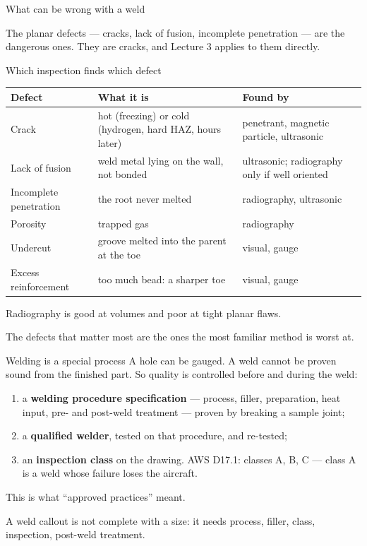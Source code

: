 \documentclass[aspectratio=169,10pt]{beamer}
\begin{document}
\begin{frame}{What can be wrong with a weld}
\centering
\resizebox{0.8\textwidth}{!}{}

\vfill\raggedright
The \alert{planar} defects --- cracks, lack of fusion, incomplete penetration --- are the dangerous
ones. They are cracks, and Lecture 3 applies to them directly.
\end{frame}

\begin{frame}{Which inspection finds which defect}
\centering\footnotesize
\begin{tabular}{@{}lll@{}}
\toprule
\textbf{Defect} & \textbf{What it is} & \textbf{Found by}\\
\midrule
Crack & hot (freezing) or cold (hydrogen, hard HAZ, hours later) & penetrant, magnetic particle, ultrasonic\\
Lack of fusion & weld metal lying on the wall, not bonded & ultrasonic; radiography only if well oriented\\
Incomplete penetration & the root never melted & radiography, ultrasonic\\
Porosity & trapped gas & radiography\\
Undercut & groove melted into the parent at the toe & visual, gauge\\
Excess reinforcement & too much bead: a sharper toe & visual, gauge\\
\bottomrule
\end{tabular}

\vfill\raggedright\normalsize
Radiography is good at volumes and poor at tight planar flaws.

\alert{The defects that matter most are the ones the most familiar method is worst at.}
\end{frame}

\begin{frame}{Welding is a special process}
A hole can be gauged. A weld cannot be proven sound from the finished part. So quality is
controlled \alert{before and during} the weld:
\begin{enumerate}
  \item a \textbf{welding procedure specification} --- process, filler, preparation, heat input,
        pre- and post-weld treatment --- proven by breaking a sample joint;
  \item a \textbf{qualified welder}, tested on that procedure, and re-tested;
  \item an \textbf{inspection class} on the drawing. AWS D17.1: classes A, B, C --- class A is a
        weld whose failure loses the aircraft.
\end{enumerate}
\vfill
This is what ``approved practices'' meant.

A weld callout is not complete with a size: it needs \alert{process, filler, class, inspection,
post-weld treatment}.
\end{frame}
\end{document}
